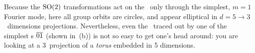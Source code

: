\documentclass[aip,cha,reprint,
secnumarabic,
nofootinbib, tightenlines,
nobibnotes, showkeys, showpacs,
groupedaddress
]{revtex4-1}
\begin{document}
Because the $\textrm{SO}(2)$ transformations act on the \cLf\ only through the
simplest, $m=1$ Fourier mode, here all group orbits are circles, and
appear elliptical in $d=5 \to 3$~dimensions projections. Nevertheless,
even the \wurst\ traced out by one of
the simplest \rpo s
$\overline{01}$ (shown in \,(b)) is not so
easy to get one's head around: you are looking at a 3\dmn\ projection of
a \emph{torus} embedded in 5 dimensions.

\end{document}
